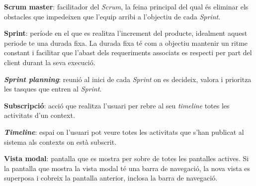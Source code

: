 \textbf{Scrum master}: facilitador del \textit{Scrum}, la feina principal del qual és eliminar els obstacles que impedeixen que l'equip arribi a l'objectiu de cada \textit{Sprint}.

\textbf{Sprint}: període en el que es realitza l'increment del producte, idealment aquest periode te una durada fixa. La durada fixa té com a objectiu mantenir un ritme constant i facilitar que l'abast dels requeriments associats es respecti per part del client durant la seva execució. 

\textbf{\textit{Sprint planning}}: reunió al inici de cada \textit{Sprint} on es decideix, valora i prioritza les tasques que entren al \textit{Sprint}.

\textbf{Subscripció}: acció que realitza l'usuari per rebre al seu \textit{timeline} totes les activitats d'un context.

\textbf{\textit{Timeline}}: espai on l'usuari pot veure totes les activitats que s'han publicat al sistema als contexts on està subscrit.

\textbf{Vista modal}: pantalla que es mostra per sobre de totes les pantalles actives. Si la pantalla que mostra la vista modal té una barra de navegació, la nova vista es superposa i cobreix la pantalla anterior, inclosa la barra de navegació.
